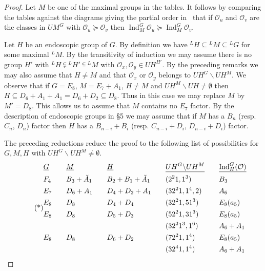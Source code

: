 \documentclass{amsart}
\newcommand\Ind	{\operatorname{Ind}}
\newcommand\cO		{{\mathcal O}}
\begin{document}
\begin{proof} Let $M$ be one of the maximal groups in the tables. 
It follows
by comparing the tables against the diagrams giving the partial
order 
in~\cite{Sp} that if $\cO_u$ and $\cO_v$ are the classes in $UM^G$
with
$\cO_u \succeq \cO_v$ then $\Ind_M^G \cO_u \succeq \Ind_M^G \cO_v$.

Let $H$ be an endoscopic group of $G$.  By definition we have
${}^L H \subseteq {}^L M \subseteq {}^L G$ for some maximal ${}^L
M$.  By
the transitivity of induction we may assume there is no group
$H'$ with
${}^L H \subsetneqq {}^L H' \subseteqq {}^L M$ with $\cO_x, \cO_y
\in UH^{H'}$.
By the preceding remarks we may also assume that $H \ne M$ and
that
$\cO_x$ or $\cO_y$ belongs to $UH^G \backslash UH^M$.  We observe
that if
$G = E_8$, $M = E_7 + A_1$, $H \ne M$ and $UH^M \backslash UH \ne
\emptyset$
then $H \subseteq D_6 + A_1 + A_1 = D_6 + D_2 \subseteq D_8$. 
Thus in this
case we may replace $M$ by $M' = D_8$.  This allows us to assume
that $M$
contains no $E_7$ factor.  By the description of endoscopic
groups in \S 5
we may assume that if $M$ has a $B_n$ (resp. $C_n$, $D_n$) factor
then $H$
has a $B_{n-i} + B_i$ (resp. $C_{n-i} + D_i$, $D_{n-i} + D_i$)
factor.

The preceding reductions reduce the proof to the following list
of
possibilities for $G, M, H$ with $UH^G \backslash UH^M \ne
\emptyset$.
     \begin{equation}\tag{*}
     \begin{alignedat} 5
     &\underline{G} &\qquad &\underline{M} &\qquad
          &\underline{H} &\qquad &\underline{UH^G \backslash
UH^M} 
          &\qquad &\underline{\Ind_H^G (\cO)}\\
     &F_4 &\qquad &B_3 + \tilde A_1 &\qquad &B_2 + B_1 + \tilde
A_1 
          &\qquad &(2^21, 1^3) &\qquad &B_3 \\
     &E_7 &\qquad &D_6 + A_1 &\qquad &D_4 + D_2 + A_1 &\qquad
&(32^21,1^4,2)
          &\qquad &A_6 \\
     &E_8 &\qquad &D_8 &\qquad &D_4 + D_4 &\qquad &(32^21,51^3)
          &\qquad &E_8(a_5) \\
     &E_8 &\qquad &D_8 &\qquad &D_5 + D_3 &\qquad &(52^21,31^3)
          &\qquad &E_8(a_5) \\
     &&&&&&&(32^21^3,1^6) &\qquad &A_6 + A_1 \\
     &E_8 &\qquad &D_8 &\qquad &D_6 + D_2 &\qquad &(72^21,1^4)
          &\qquad &E_8(a_5) \\
     &&&&&&&(32^41,1^4) &\qquad &A_6 + A_1
     \end{alignedat}
\end{equation}


\end{proof}
\end{document}
